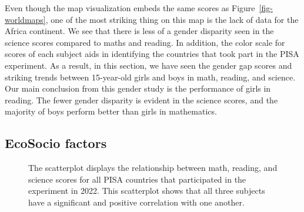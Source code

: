 \documentclass[
  11pt,
  a4paper,
]{article}
\begin{document}
Even though the map visualization embeds the same scores as
Figure~\ref{fig-worldmaps}, one of the most striking thing on this map
is the lack of data for the Africa continent. We see that there is less
of a gender disparity seen in the science scores compared to maths and
reading. In addition, the color scale for scores of each subject aids in
identifying the countries that took part in the PISA experiment. As a
result, in this section, we have seen the gender gap scores and striking
trends between 15-year-old girls and boys in math, reading, and science.
Our main conclusion from this gender study is the performance of girls
in reading. The fewer gender disparity is evident in the science scores,
and the majority of boys perform better than girls in mathematics.

\subsection{EcoSocio factors}\label{ecosocio-factors}

\begin{figure}[H]


\caption{\label{fig-corrplot}The scatterplot displays the relationship
between math, reading, and science scores for all PISA countries that
participated in the experiment in 2022. This scatterplot shows that all
three subjects have a significant and positive correlation with one
another.}

\end{figure}%
\end{document}
